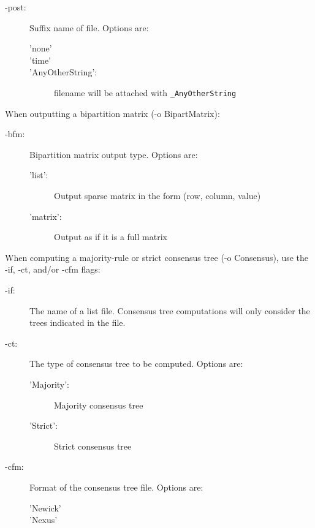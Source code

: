 \documentclass[11pt]{article}
\begin{document}
\begin{enumerate}[{\bf (1)}]
\begin{description}
	\item[-post:] Suffix name of file. Options are:
		\begin{description}
			\item['none'] 
			\item['time']
			\item['AnyOtherString':] filename will be attached with {\tt \_AnyOtherString}  
		\end{description}
	\end{description}

\vspace{0.5cm}

When outputting a bipartition matrix (-o BipartMatrix):
	\begin{description}
	\item[-bfm:] Bipartition matrix output type. Options are: 
		\begin{description}
		\item['list':] Output sparse matrix in the form (row, column, value)
		\item['matrix':] Output as if it is a full matrix
		\end{description}
	\end{description}
	
\vspace{0.5cm}
		
When computing a majority-rule or strict consensus tree (-o Consensus), use the -if, -ct,
and/or -cfm flags:
	\begin{description}
	\item[-if:] The name of a list file. Consensus tree computations will only consider the trees indicated in the file.
	
	\item[-ct:] The type of consensus tree to be computed. Options are:
		\begin{description}
		\item['Majority':] Majority consensus tree
		\item['Strict':] Strict consensus tree
		\end{description}
	
	\item[-cfm:] Format of the consensus tree file. Options are:
		\begin{description}
		\item['Newick']
		\item['Nexus']
		\end{description}
	\end{description}


\end{enumerate}
\end{document}

